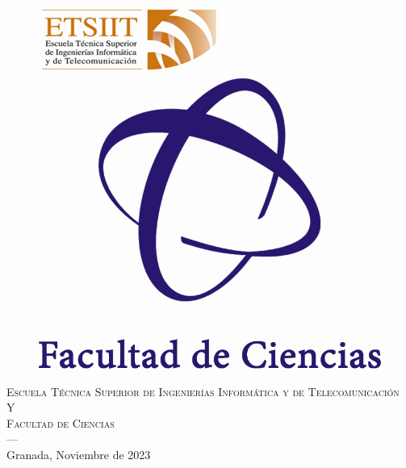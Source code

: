 \begin{titlepage}
\begin{minipage}{\textwidth}
\begin{figure}[H]
  \centering
  \includegraphics[width=.3\textwidth]{logos/etsiit_logo.png}\hspace{0.2\textwidth}
  \includegraphics[width=.17\textwidth]{logos/ciencias-logo.png}
\end{figure}
\textsc{Escuela Técnica Superior de Ingenierías Informática y de Telecomunicación}\\[0.1cm]
\textsc{Y}\\
\textsc{Facultad de Ciencias}\\
\textsc{---}\\
Granada, Noviembre de 2023
\end{minipage}
\end{titlepage}
